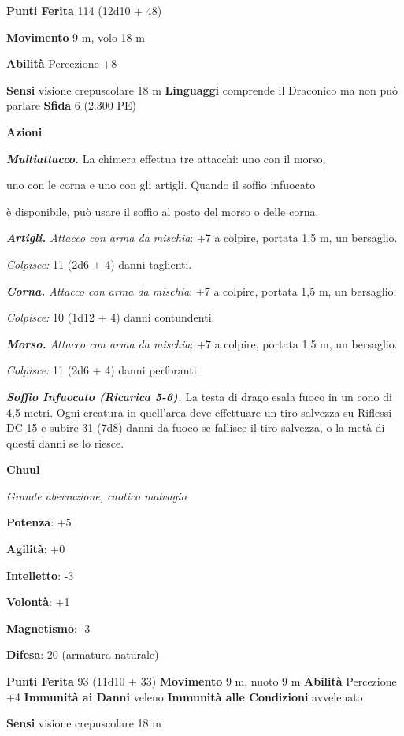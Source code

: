 \begin{multicols}{2}
\textbf{Punti Ferita} 114 (12d10 + 48)

\textbf{Movimento} 9 m, volo 18 m

\textbf{Abilità} Percezione +8

\textbf{Sensi} visione crepuscolare 18 m
\textbf{Linguaggi} comprende il Draconico ma non può parlare
\textbf{Sfida} 6 (2.300 PE)

\textbf{Azioni}

\emph{\textbf{Multiattacco.}} La chimera effettua tre attacchi: uno con
il morso,

uno con le corna e uno con gli artigli. Quando il soffio infuocato

è disponibile, può usare il soffio al posto del morso o delle corna.

\emph{\textbf{Artigli.} Attacco con arma da mischia}: +7 a colpire,
portata 1,5 m, un bersaglio.

\emph{Colpisce:} 11 (2d6 + 4) danni taglienti.

\emph{\textbf{Corna.} Attacco con arma da mischia}: +7 a colpire,
portata 1,5 m, un bersaglio.

\emph{Colpisce:} 10 (1d12 + 4) danni contundenti.

\emph{\textbf{Morso.} Attacco con arma da mischia}: +7 a colpire,
portata 1,5 m, un bersaglio.

\emph{Colpisce:} 11 (2d6 + 4) danni perforanti.

\emph{\textbf{Soffio Infuocato (Ricarica 5-6).}} La testa di drago esala
fuoco in un cono di 4,5 metri. Ogni creatura in quell'area deve
effettuare un tiro salvezza su Riflessi DC 15 e subire 31 (7d8) danni
da fuoco se fallisce il tiro salvezza, o la metà di questi danni se lo
riesce.

\textbf{Chuul}

\emph{Grande aberrazione, caotico malvagio}

\textbf{Potenza}: +5

\textbf{Agilità}: +0

\textbf{Intelletto}: -3

\textbf{Volontà}: +1

\textbf{Magnetismo}: -3

\textbf{Difesa}: 20 (armatura naturale)

\textbf{Punti Ferita} 93 (11d10 + 33) \textbf{Movimento} 9 m, nuoto 9 m
\textbf{Abilità} Percezione +4 \textbf{Immunità ai Danni} veleno
\textbf{Immunità alle Condizioni} avvelenato

\textbf{Sensi} visione crepuscolare 18 m


\end{multicols}
